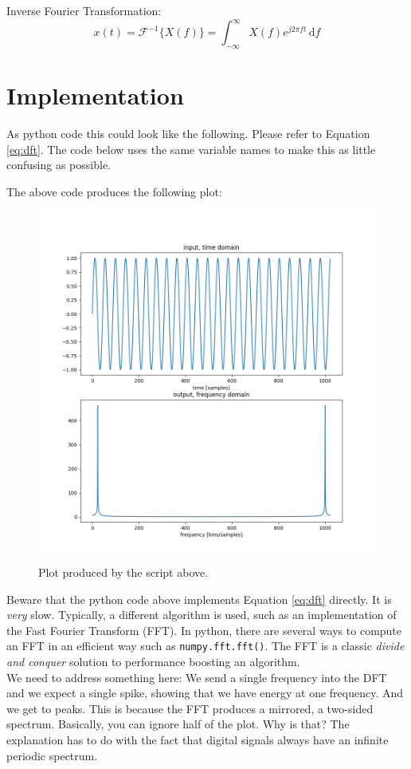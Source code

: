 Inverse Fourier Transformation:\\
\begin{equation}
	x(t)= \mathcal{F}^{-1} \{X(f)\} = \int_{-\infty}^\infty \! X(f) e^{j2\pi ft} \, \mathrm{d}f
\end{equation}

\section{Implementation}


As python code this could look like the following. Please refer to Equation \ref{eq:dft}. The code below uses the same variable names to make this as little confusing as possible.
\newpage

The above code produces the following plot:
\begin{figure}[H]
	\centering
	\includegraphics[width=\textwidth]{img/pythonDFT.png}
	\caption[DFT Plot]
	{Plot produced by the script above.}
	\label{fig:label}
\end{figure}

Beware that the python code above implements Equation \ref{eq:dft} directly. It is \textit{very} slow. Typically, a different algorithm is used, such as an implementation of the Fast Fourier Transform (FFT). In python, there are several ways to compute an FFT in an efficient way such as \texttt{numpy.fft.fft()}. The FFT is a classic \textit{divide and conquer} solution to performance boosting an algorithm.\\
We need to address something here: We send a single frequency into the DFT and we expect a single spike, showing that we have energy at one frequency. And we get to peaks. This is because the FFT produces a mirrored, a two-sided spectrum. Basically, you can ignore half of the plot. Why is that? The explanation has to do with the fact that digital signals always have an infinite periodic spectrum.



